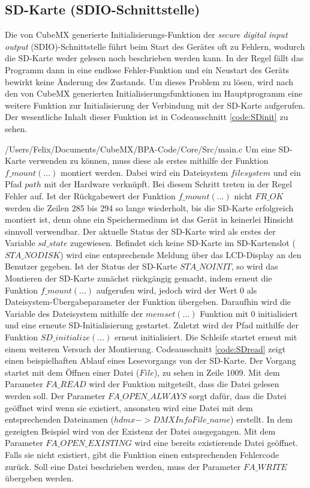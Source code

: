 
\subsection{SD-Karte (SDIO-Schnittstelle)}

Die von CubeMX generierte Initialisierungs-Funktion der \textit{secure digital input output} (SDIO)-Schnittstelle führt beim Start des Gerätes oft zu Fehlern, wodurch die SD-Karte weder gelesen noch beschrieben werden kann. In der Regel fällt das Programm dann in eine endlose Fehler-Funktion und ein Neustart des Geräts bewirkt keine Änderung des Zustands. Um dieses Problem zu lösen, wird nach den von CubeMX generierten Initialisierungsfunktionen im Hauptprogramm eine weitere Funktion zur Initialisierung der Verbindung mit der SD-Karte aufgerufen. Der wesentliche Inhalt dieser Funktion ist in Codeausschnitt \ref{code:SDinit} zu sehen.

{/Users/Felix/Documents/CubeMX/BPA-Code/Core/Src/main.c}
Um eine SD-Karte verwenden zu können, muss diese als erstes mithilfe der Funktion $f\_mount(...)$ montiert werden. Dabei wird ein Dateisystem $filesystem$ und ein Pfad $path$ mit der Hardware verknüpft. Bei diesem Schritt treten in der Regel Fehler auf. Ist der Rückgabewert der Funktion $f\_mount(...)$ nicht $FR\_OK$ werden die Zeilen 285 bis 294 so lange wiederholt, bis die SD-Karte erfolgreich montiert ist, denn ohne ein Speichermedium ist das Gerät in keinerlei Hinsicht sinnvoll verwendbar. Der aktuelle Status der SD-Karte wird als erstes der Variable $sd\_state$ zugewiesen. Befindet sich keine SD-Karte im SD-Kartenslot ($STA\_NODISK$) wird eine entsprechende Meldung über das LCD-Display an den Benutzer gegeben. Ist der Status der SD-Karte $STA\_NOINIT$, so wird das Montieren der SD-Karte zunächst rückgängig gemacht, indem erneut die Funktion $f\_mount(...)$ aufgerufen wird, jedoch wird der Wert 0 als Dateisystem-Übergabeparameter der Funktion übergeben. Daraufhin wird die Variable des Dateisystem mithilfe der $memset(...)$ Funktion mit 0 initialisiert und eine erneute SD-Initialisierung gestartet. Zuletzt wird der Pfad mithilfe der Funktion $SD\_initialize(...)$ erneut initialisiert. Die Schleife startet erneut mit einem weiteren Versuch der Montierung.
\newline
Codeausschnitt \ref{code:SDread} zeigt einen beispielhaften Ablauf eines Lesevorgangs von der SD-Karte. Der Vorgang startet mit dem Öffnen einer Datei ($File$), zu sehen in Zeile 1009. Mit dem Parameter $FA\_READ$ wird der Funktion mitgeteilt, dass die Datei gelesen werden soll. Der Parameter $FA\_OPEN\_ALWAYS$ sorgt dafür, dass die Datei geöffnet wird wenn sie existiert, ansonsten wird eine Datei mit dem entsprechenden Dateinamen ($hdmx->DMXInfoFile\_name$) erstellt. In dem gezeigten Beispiel wird von der Existenz der Datei ausgegangen. Mit dem Parameter $FA\_OPEN\_EXISTING$ wird eine bereits existierende Datei geöffnet. Falls sie nicht existiert, gibt die Funktion einen entsprechenden Fehlercode zurück. Soll eine Datei beschrieben werden, muss der Parameter $FA\_WRITE$ übergeben werden.
